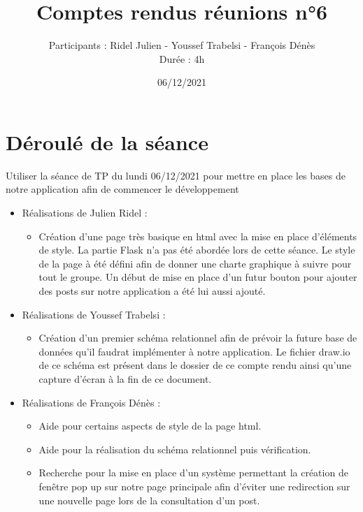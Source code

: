 \documentclass{article}
\title{\Huge Comptes rendus réunions n°6}
\author{Participants : Ridel Julien - Youssef Trabelsi - François Dénès \\ Durée : 4h}
\date{06/12/2021}
\begin{document}
\maketitle

\section{\huge Déroulé de la séance}

\Large Utiliser la séance de TP du lundi 06/12/2021 pour mettre en place les bases de notre application afin de commencer le développement


\begin{itemize}

    \item \Large Réalisations de Julien Ridel :
    
    \begin{itemize}
        \item \Large Création d'une page très basique en html avec la mise en place d'éléments de style. La partie Flask n'a pas été abordée lors de cette séance. Le style de la page à été défini afin de donner une charte graphique à suivre pour tout le groupe.
        Un début de mise en place d'un futur bouton pour ajouter des posts sur notre application a été lui aussi ajouté.
    \end{itemize} 
    
     \item \Large Réalisations de Youssef Trabelsi :
    
    \begin{itemize}
        \item \Large Création d'un premier schéma relationnel afin de prévoir la future base de données qu'il faudrat implémenter à notre application. Le fichier draw.io de ce schéma est présent dans le dossier de ce compte rendu ainsi qu'une capture d'écran à la fin de ce document.
    \end{itemize} 
    
    \item \Large Réalisations de François Dénès :
    
    \begin{itemize}
        
        \item \Large Aide pour certains aspects de style de la page html.
        \item \Large Aide pour la réalisation du schéma relationnel puis vérification.
        \item \Large Recherche pour la mise en place d'un système permettant la création de fenêtre pop up sur notre page principale afin d'éviter une redirection sur une nouvelle page lors de la consultation d'un post.
    \end{itemize} 
\end{itemize}
\end{document}
